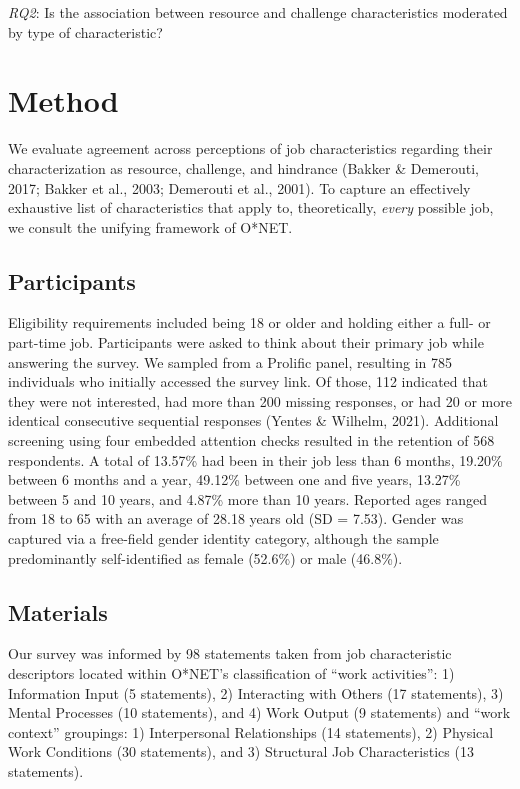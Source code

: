 \documentclass[
  jou]{apa6}
\begin{document}
\emph{RQ2}: Is the association between resource and challenge characteristics moderated by type of characteristic?

\hypertarget{method}{%
\section{Method}\label{method}}

We evaluate agreement across perceptions of job characteristics regarding their characterization as resource, challenge, and hindrance (Bakker \& Demerouti, 2017; Bakker et al., 2003; Demerouti et al., 2001). To capture an effectively exhaustive list of characteristics that apply to, theoretically, \emph{every} possible job, we consult the unifying framework of O*NET.

\hypertarget{participants}{%
\subsection{Participants}\label{participants}}

Eligibility requirements included being 18 or older and holding either a full- or part-time job. Participants were asked to think about their primary job while answering the survey. We sampled from a Prolific panel, resulting in 785 individuals who initially accessed the survey link. Of those, 112 indicated that they were not interested, had more than 200 missing responses, or had 20 or more identical consecutive sequential responses (Yentes \& Wilhelm, 2021). Additional screening using four embedded attention checks resulted in the retention of 568 respondents. A total of 13.57\% had been in their job less than 6 months, 19.20\% between 6 months and a year, 49.12\% between one and five years, 13.27\% between 5 and 10 years, and 4.87\% more than 10 years. Reported ages ranged from 18 to 65 with an average of 28.18 years old (SD = 7.53). Gender was captured via a free-field gender identity category, although the sample predominantly self-identified as female (52.6\%) or male (46.8\%).

\hypertarget{materials}{%
\subsection{Materials}\label{materials}}

Our survey was informed by 98 statements taken from job characteristic descriptors located within O*NET's classification of ``work activities'': 1) Information Input (5 statements), 2) Interacting with Others (17 statements), 3) Mental Processes (10 statements), and 4) Work Output (9 statements) and ``work context'' groupings: 1) Interpersonal Relationships (14 statements), 2) Physical Work Conditions (30 statements), and 3) Structural Job Characteristics (13 statements).
\end{document}
